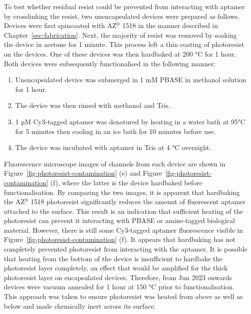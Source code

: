 \documentclass[
  a4paper,
]{scrbook}
\begin{document}
To test whether residual resist could be prevented from interacting with
aptamer by crosslinking the resist, two unencapsulated devices were
prepared as follows. Devices were first spincoated with AZ\(^\circledR\)
1518 in the manner described in Chapter~\ref{sec-fabrication}. Next, the
majority of resist was removed by soaking the device in acetone for 1
minute. This process left a thin coating of photoresist on the devices.
One of these devices was then hardbaked at 200 °C for 1 hour. Both
devices were subsequently functionalised in the following manner:

\begin{enumerate}
\def\labelenumi{\arabic{enumi}.}
\item
  Unencapsulated device was submerged in 1 mM PBASE in methanol solution
  for 1 hour.
\item
  The device was then rinsed with methanol and Tris.
\item
  1 µM Cy3-tagged aptamer was denatured by heating in a water bath at
  95°C for 5 minutes then cooling in an ice bath for 10 minutes before
  use.
\item
  The device was incubated with aptamer in Tris at 4 °C overnight.
\end{enumerate}

Fluorescence microscope images of channels from each device are shown in
Figure~\ref{fig-photoresist-contamination} (e) and
Figure~\ref{fig-photoresist-contamination} (f), where the latter is the
device hardbaked before functionalisation. By comparing the two images,
it is apparent that hardbaking the AZ\(^\circledR\) 1518 photoresist
significantly reduces the amount of fluorescent aptamer attached to the
surface. This result is an indication that sufficient heating of the
photoresist can prevent it interacting with PBASE or amine-tagged
biological material. However, there is still some Cy3-tagged aptamer
fluorescence visible in Figure~\ref{fig-photoresist-contamination} (f).
It appears that hardbaking has not completely prevented photoresist from
interacting with the aptamer. It is possible that heating from the
bottom of the device is insufficient to hardbake the photoresist layer
completely, an effect that would be amplified for the thick photoresist
layer on encapsulated devices. Therefore, from Jun 2023 onwards devices
were vacuum annealed for 1 hour at 150 °C prior to functionalisation.
This approach was taken to ensure photoresist was heated from above as
well as below and made chemically inert across its surface.
\end{document}
